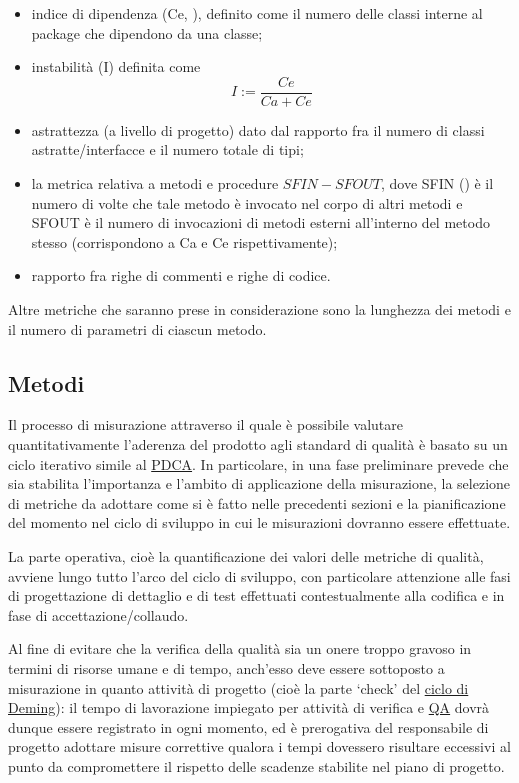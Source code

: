 \begin{itemize}
  \item indice di dipendenza (Ce, ), definito come il numero delle classi interne al package che dipendono da una classe;
  \item instabilità (I) definita come \[
  I := \frac{Ce}{Ca + Ce}
  \]
  \item astrattezza (a livello di progetto) dato dal rapporto fra il numero di classi astratte/interfacce e il numero totale di tipi;
  \item la metrica relativa a metodi e procedure $SFIN - SFOUT$, dove SFIN () è il numero di volte che tale metodo è invocato nel corpo di altri metodi e SFOUT è il numero di invocazioni di metodi esterni all'interno del metodo stesso (corrispondono a Ca e Ce rispettivamente);
  \item rapporto fra righe di commenti e righe di codice.
\end{itemize}

Altre metriche che saranno prese in considerazione sono la lunghezza dei metodi e il numero di parametri di ciascun metodo.

\subsection{Metodi}
 Il processo di misurazione attraverso il quale è possibile valutare quantitativamente l'aderenza del prodotto agli standard di qualità è basato su un ciclo iterativo simile al \underline{PDCA}\@. In particolare, in una fase preliminare prevede che sia stabilita l'importanza e l'ambito di applicazione della misurazione, la selezione di metriche da adottare come si è fatto nelle precedenti sezioni e la pianificazione del momento nel ciclo di sviluppo in cui le misurazioni dovranno essere effettuate.

La parte operativa, cioè la quantificazione dei valori delle metriche di qualità, avviene lungo tutto l'arco del ciclo di sviluppo, con particolare attenzione alle fasi di progettazione di dettaglio e di test effettuati contestualmente alla codifica e in fase di accettazione/collaudo.

 Al fine di evitare che la verifica della qualità sia un onere troppo gravoso in termini di risorse umane e di tempo, anch'esso deve essere sottoposto a misurazione in quanto attività di progetto (cioè la parte `check' del \underline{ciclo di Deming}): il tempo di lavorazione impiegato per attività di verifica e \underline{QA} dovrà dunque essere registrato in ogni momento, ed è prerogativa del responsabile di progetto adottare misure correttive qualora i tempi dovessero risultare eccessivi al punto da compromettere il rispetto delle scadenze stabilite nel piano di progetto.

